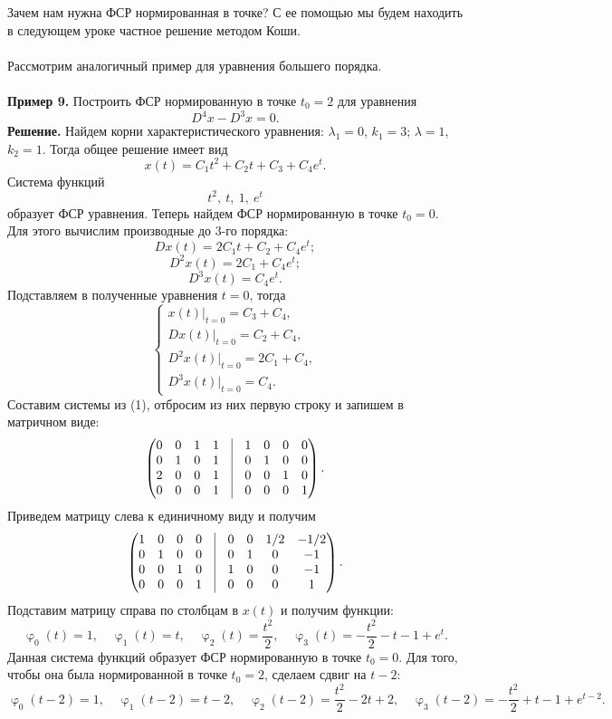 \documentclass[a4paper, 12pt]{article}
\renewcommand{\varphi}{\upvarphi}
\begin{document}
Зачем нам нужна ФСР нормированная в точке? С ее помощью мы будем находить в следующем уроке частное решение методом Коши.\\\\
Рассмотрим аналогичный пример для уравнения большего порядка.\\\\
\textbf{Пример 9.} Построить ФСР нормированную в точке $t_0 = 2$ для уравнения $$D^4x-D^3x = 0.$$
\textbf{Решение.} Найдем корни характеристического уравнения: $\lambda_1 = 0$, $k_1 = 3$; $\lambda = 1$, $k_2 = 1$. Тогда общее решение имеет вид $$x(t) = C_1t^2 + C_2t + C_3 + C_4e^t.$$
Система функций $$t^2,\ t,\ 1,\ e^t$$ образует ФСР уравнения.
Теперь найдем ФСР нормированную в точке $t_0 = 0$. Для этого вычислим производные до 3-го порядка:
$$Dx(t) = 2C_1t + C_2 + C_4e^t;$$
$$D^2x(t) = 2C_1 + C_4e^t;$$
$$D^3x(t) = C_4e^t.$$
Подставляем в полученные уравнения $t = 0$, тогда
$$\begin{cases}
	x(t)|_{t=0} = C_3 + C_4,\\
	Dx(t)|_{t=0} = C_2 + C_4,\\
	D^2x(t)|_{t=0} = 2C_1 + C_4,\\
	D^3x(t)|_{t=0} = C_4.
\end{cases}$$
Составим системы из (1), отбросим из них первую строку и запишем в матричном виде:
$$\begin{pmatrix}
	0 & 0 & 1 & 1 & \vline & 1 & 0 & 0 & 0\\
	0 & 1 & 0 & 1 & \vline & 0 & 1 & 0 & 0\\
	2 & 0 & 0 & 1 & \vline & 0 & 0 & 1 & 0\\
	0 & 0 & 0 & 1 & \vline & 0 & 0 & 0 & 1
\end{pmatrix}.$$
Приведем матрицу слева к единичному виду и получим
$$\begin{pmatrix}
	1 & 0 & 0 & 0 & \vline & 0 & 0 & 1/2 & -1/2\\
	0 & 1 & 0 & 0 & \vline & 0 & 1 & 0 & -1\\
	0 & 0 & 1 & 0 & \vline & 1 & 0 & 0 & -1\\
	0 & 0 & 0 & 1 & \vline & 0 & 0 & 0 & 1
\end{pmatrix}.$$
Подставим матрицу справа по столбцам в $x(t)$ и получим функции:
$$\varphi_0(t) = 1,\quad \varphi_1(t) = t,\quad \varphi_2(t) = \dfrac{t^2}{2},\quad \varphi_3(t) = -\dfrac{t^2}{2} - t - 1 + e^t.$$
Данная система функций образует ФСР нормированную в точке $t_0 = 0$. Для того, чтобы она была нормированной в точке $t_0 = 2$, сделаем сдвиг на $t-2$:
$$\varphi_0(t-2) = 1,\quad \varphi_1(t-2) = t-2,\quad \varphi_2(t-2) = \dfrac{t^2}{2}-2t+2,\quad \varphi_3(t-2) = -\dfrac{t^2}{2} + t - 1 + e^{t-2}.$$
\end{document}
